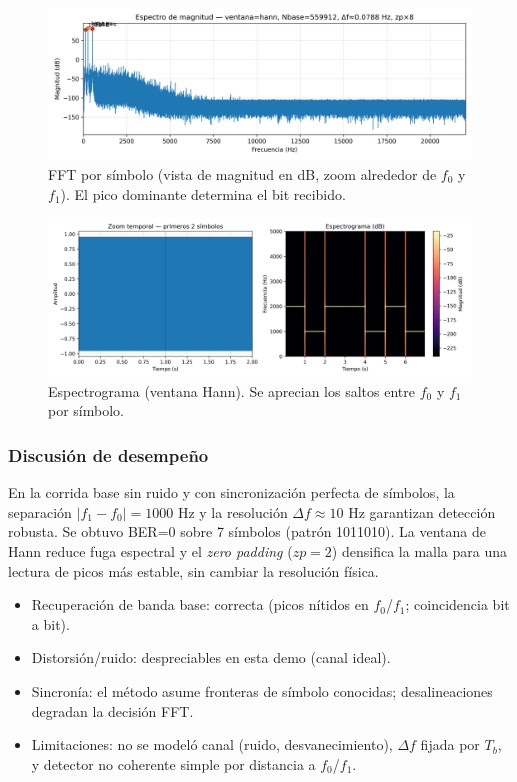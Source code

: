 \documentclass[letter,12pt]{article}
\begin{document}
\begin{figure}[H]
  \centering
  \includegraphics[width=0.95\linewidth]{../Codigo_Fuente/figs/magnitude_db_zoom.png}
  \caption{FFT por símbolo (vista de magnitud en dB, zoom alrededor de \(f_0\) y \(f_1\)). El pico dominante determina el bit recibido.}
  \label{fig:demod-freq}
\end{figure}

\begin{figure}[H]
  \centering
  \includegraphics[width=0.95\linewidth]{../Codigo_Fuente/figs/fsk_demo_zoom_spectrogram.png}
  \caption{Espectrograma (ventana Hann). Se aprecian los saltos entre \(f_0\) y \(f_1\) por símbolo.}
  \label{fig:fsk-spec}
\end{figure}

\subsubsection{Discusión de desempeño}
En la corrida base sin ruido y con sincronización perfecta de símbolos, la separación \(|f_1-f_0|=1000\) Hz y la resolución \(\Delta f\approx 10\) Hz garantizan detección robusta. Se obtuvo BER=0 sobre 7 símbolos (patrón 1011010). La ventana de Hann reduce fuga espectral y el \emph{zero padding} (\(zp=2\)) densifica la malla para una lectura de picos más estable, sin cambiar la resolución física.
\begin{itemize}
  \item Recuperación de banda base: correcta (picos nítidos en \(f_0\)/\(f_1\); coincidencia bit a bit).
  \item Distorsión/ruido: despreciables en esta demo (canal ideal).
  \item Sincronía: el método asume fronteras de símbolo conocidas; desalineaciones degradan la decisión FFT.
  \item Limitaciones: no se modeló canal (ruido, desvanecimiento), \(\Delta f\) fijada por \(T_b\), y detector no coherente simple por distancia a \(f_0\)/\(f_1\).
\end{itemize}

    
\newpage
\printbibliography
\end{document}
